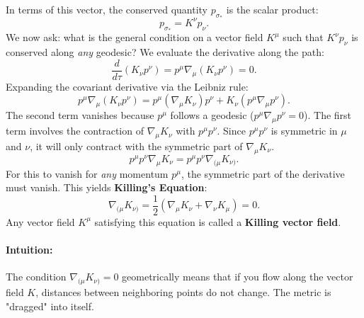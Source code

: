 \documentclass[11pt, a4paper]{report}
\begin{document}
In terms of this vector, the conserved quantity \(p_{\sigma_*}\) is the scalar product:
\begin{equation}
p_{\sigma_*} = K^\nu p_\nu.
\end{equation}
We now ask: what is the general condition on a vector field \(K^\mu\) such that \(K^\nu p_\nu\) is conserved along \textit{any} geodesic? We evaluate the derivative along the path:
\begin{equation}
\frac{d}{d\tau} (K_\nu p^\nu) = p^\mu \nabla_\mu (K_\nu p^\nu) = 0.
\end{equation}
Expanding the covariant derivative via the Leibniz rule:
\begin{equation}
p^\mu \nabla_\mu (K_\nu p^\nu) = p^\mu ( \nabla_\mu K_\nu ) p^\nu + K_\nu ( p^\mu \nabla_\mu p^\nu ).
\end{equation}
The second term vanishes because \(p^\mu\) follows a geodesic (\(p^\mu \nabla_\mu p^\nu = 0\)).
The first term involves the contraction of \(\nabla_\mu K_\nu\) with \(p^\mu p^\nu\). Since \(p^\mu p^\nu\) is symmetric in \(\mu\) and \(\nu\), it will only contract with the symmetric part of \(\nabla_\mu K_\nu\).
\begin{equation}
p^\mu p^\nu \nabla_\mu K_\nu = p^\mu p^\nu \nabla_{(\mu} K_{\nu)}.
\end{equation}
For this to vanish for \textit{any} momentum \(p^\mu\), the symmetric part of the derivative must vanish. This yields \textbf{Killing's Equation}:
\begin{equation}
\label{eq:killing_eq}
\nabla_{(\mu} K_{\nu)} = \frac{1}{2} (\nabla_\mu K_\nu + \nabla_\nu K_\mu) = 0.
\end{equation}
Any vector field \(K^\mu\) satisfying this equation is called a \textbf{Killing vector field}.

\paragraph{Intuition:} The condition \(\nabla_{(\mu} K_{\nu)} = 0\) geometrically means that if you flow along the vector field \(K\), distances between neighboring points do not change. The metric is "dragged" into itself.
\end{document}
